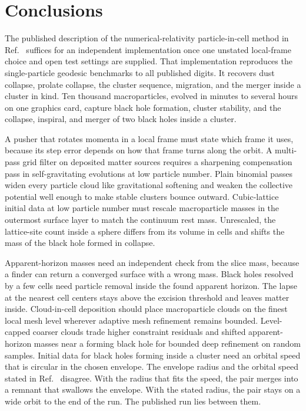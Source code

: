 \section{Conclusions}\label{sec:conclusions}

The published description of the numerical-relativity particle-in-cell method in Ref.~\cite{Wu:2026nrpic} suffices for an independent implementation once one unstated local-frame choice and open test settings are supplied. That implementation reproduces the single-particle geodesic benchmarks to all published digits. It recovers dust collapse, prolate collapse, the cluster sequence, migration, and the merger inside a cluster in kind. Ten thousand macroparticles, evolved in minutes to several hours on one graphics card, capture black hole formation, cluster stability, and the collapse, inspiral, and merger of two black holes inside a cluster.

A pusher that rotates momenta in a local frame must state which frame it uses, because its step error depends on how that frame turns along the orbit. A multi-pass grid filter on deposited matter sources requires a sharpening compensation pass in self-gravitating evolutions at low particle number. Plain binomial passes widen every particle cloud like gravitational softening and weaken the collective potential well enough to make stable clusters bounce outward. Cubic-lattice initial data at low particle number must rescale macroparticle masses in the outermost surface layer to match the continuum rest mass. Unrescaled, the lattice-site count inside a sphere differs from its volume in cells and shifts the mass of the black hole formed in collapse.

Apparent-horizon masses need an independent check from the slice mass, because a finder can return a converged surface with a wrong mass. Black holes resolved by a few cells need particle removal inside the found apparent horizon. The lapse at the nearest cell centers stays above the excision threshold and leaves matter inside. Cloud-in-cell deposition should place macroparticle clouds on the finest local mesh level wherever adaptive mesh refinement remains bounded. Level-capped coarser clouds trade higher constraint residuals and shifted apparent-horizon masses near a forming black hole for bounded deep refinement on random samples. Initial data for black holes forming inside a cluster need an orbital speed that is circular in the chosen envelope. The envelope radius and the orbital speed stated in Ref.~\cite{Wu:2026nrpic} disagree. With the radius that fits the speed, the pair merges into a remnant that swallows the envelope. With the stated radius, the pair stays on a wide orbit to the end of the run. The published run lies between them.

